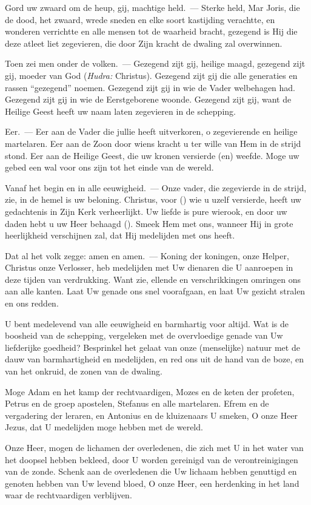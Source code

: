 \documentclass[12pt,twoside,a5paper]{article}
\begin{document}
\begin{halfparskip}
  Gord uw zwaard om de heup, gij, machtige held.~--- Sterke held, Mar Joris, die de dood, het zwaard, wrede sneden en elke soort kastijding verachtte, en wonderen verrichtte en alle mensen tot de waarheid bracht, gezegend is Hij die deze atleet liet zegevieren, die door Zijn kracht de dwaling zal overwinnen.

  Toen zei men onder de volken.~--- Gezegend zijt gij, heilige maagd, gezegend zijt gij, moeder van God (\emph{Hudra:} Christus). Gezegend zijt gij die alle generaties en rassen ``gezegend'' noemen. Gezegend zijt gij in wie de Vader welbehagen had. Gezegend zijt gij in wie de Eerstgeborene woonde. Gezegend zijt gij, want de Heilige Geest heeft uw naam laten zegevieren in de schepping.

  Eer.~--- Eer aan de Vader die jullie heeft uitverkoren, o zegevierende en heilige martelaren. Eer aan de Zoon door wiens kracht u ter wille van Hem in de strijd stond. Eer aan de Heilige Geest, die uw kronen versierde (en) weefde. Moge uw gebed een wal voor ons zijn tot het einde van de wereld.

  Vanaf het begin en in alle eeuwigheid.~--- Onze vader, die zegevierde in de strijd, zie, in de hemel is uw beloning. Christus, voor () wie u uzelf versierde, heeft uw gedachtenis in Zijn Kerk verheerlijkt. Uw liefde is pure wierook, en door uw daden hebt u uw Heer behaagd (). Smeek Hem met ons, wanneer Hij in grote heerlijkheid verschijnen zal, dat Hij medelijden met ons heeft.

  Dat al het volk zegge: amen en amen.~--- Koning der koningen, onze Helper, Christus onze Verlosser, heb medelijden met Uw dienaren die U aanroepen in deze tijden van verdrukking. Want zie, ellende en verschrikkingen omringen ons aan alle kanten. Laat Uw genade ons snel voorafgaan, en laat Uw gezicht stralen en ons redden.

  U bent medelevend van alle eeuwigheid en barmhartig voor altijd. Wat is de boosheid van de schepping, vergeleken met de overvloedige genade van Uw liefderijke goedheid? Besprinkel het gelaat van onze (menselijke) natuur met de dauw van barmhartigheid en medelijden, en red ons uit de hand van de boze, en van het onkruid, de zonen van de dwaling.

  Moge Adam en het kamp der rechtvaardigen, Mozes en de keten der profeten, Petrus en de groep apostelen, Stefanus en alle martelaren. Efrem en de vergadering der leraren, en Antonius en de kluizenaars U smeken, O onze Heer Jezus, dat U medelijden moge hebben met de wereld.

  Onze Heer, mogen de lichamen der overledenen, die zich met U in het water van het doopsel hebben bekleed, door U worden gereinigd van de verontreinigingen van de zonde. Schenk aan de overledenen die Uw lichaam hebben genuttigd en genoten hebben van Uw levend bloed, O onze Heer, een herdenking in het land waar de rechtvaardigen verblijven.
\end{halfparskip}
\end{document}
